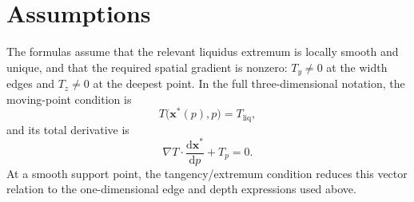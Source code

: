 \documentclass[11pt]{article}
\newcommand{\Tliq}{T_{\mathrm{liq}}}
\begin{document}
\section{Assumptions}

The formulas assume that the relevant liquidus extremum is locally smooth and
unique, and that the required spatial gradient is nonzero: $T_y\neq0$ at the
width edges and $T_z\neq0$ at the deepest point.  In the full three-dimensional
notation, the moving-point condition is
\begin{equation}
  T\bigl(\bm{x}^*(p),p\bigr)=\Tliq,
\end{equation}
and its total derivative is
\begin{equation}
  \nabla T\cdot\frac{\mathrm{d}\bm{x}^*}{\mathrm{d}p}+T_p=0.
\end{equation}
At a smooth support point, the tangency/extremum condition reduces this vector
relation to the one-dimensional edge and depth expressions used above.
\end{document}
